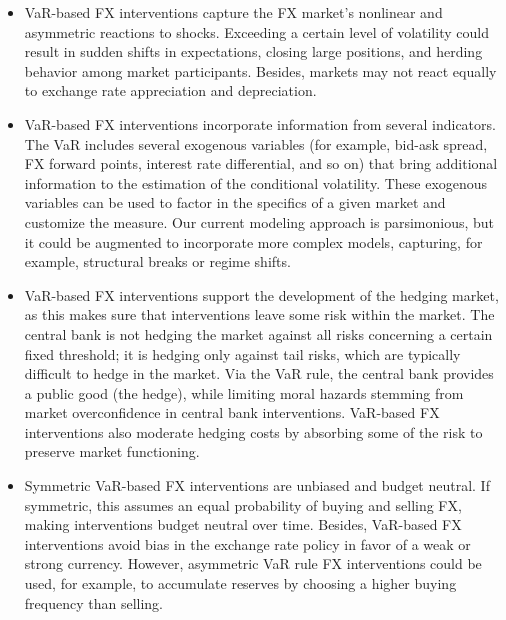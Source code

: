 \documentclass[11pt]{article}
\begin{document}
\begin{itemize}
\item  VaR-based  FX  interventions  capture the  FX  market’s  nonlinear  and
asymmetric reactions to shocks. Exceeding  a certain level of volatility could
result in sudden shifts in  expectations, closing large positions, and herding
behavior among market participants. Besides,  markets may not react equally to
exchange rate appreciation and depreciation.

\item  VaR-based   FX  interventions  incorporate  information   from  several
indicators. The VaR includes several exogenous variables (for example, bid-ask
spread, FX forward  points, interest rate differential, and so  on) that bring
additional information to the estimation  of the conditional volatility. These
exogenous variables can be  used to factor in the specifics  of a given market
and customize the measure. Our  current modeling approach is parsimonious, but
it  could be  augmented to  incorporate  more complex  models, capturing,  for
example, structural breaks or regime shifts.

\item  VaR-based  FX interventions  support  the  development of  the  hedging
market,  as this  makes sure  that interventions  leave some  risk within  the
market.  The  central  bank  is  not hedging  the  market  against  all  risks
concerning a certain  fixed threshold; it is hedging only  against tail risks,
which are typically  difficult to hedge in  the market. Via the  VaR rule, the
central bank provides a public good  (the hedge), while limiting moral hazards
stemming from  market overconfidence in central  bank interventions. VaR-based
FX interventions also moderate hedging costs  by absorbing some of the risk to
preserve market functioning.

\item Symmetric VaR-based FX interventions are unbiased and budget neutral. If
symmetric, this assumes an equal probability  of buying and selling FX, making
interventions budget  neutral over time.  Besides,  VaR-based FX interventions
avoid  bias  in  the exchange  rate  policy  in  favor  of a  weak  or  strong
currency. However,  asymmetric VaR  rule FX interventions  could be  used, for
example, to  accumulate reserves  by choosing a  higher buying  frequency than
selling.


\end{itemize}
\end{document}
